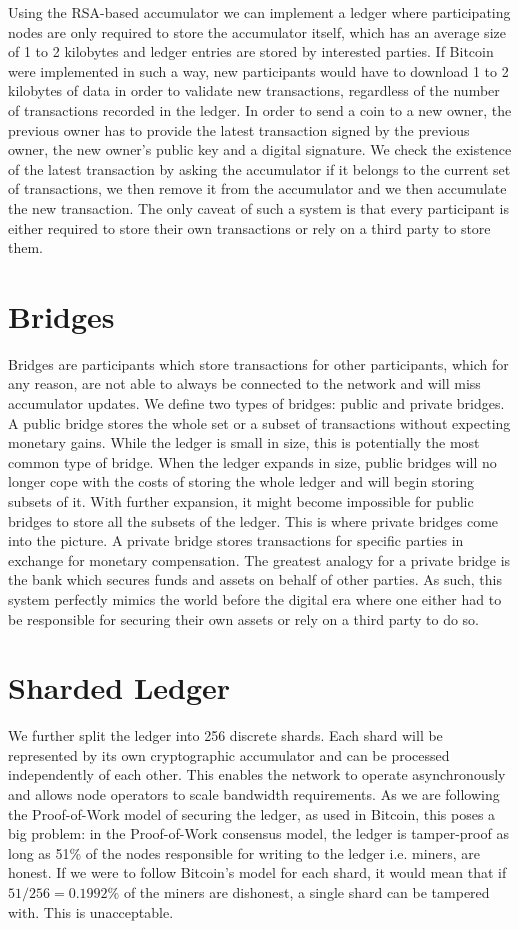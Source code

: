 \documentclass[notitlepage]{article}
\begin{document}
Using the RSA-based accumulator we can implement a ledger where participating nodes are only required to store the accumulator itself, which has an average size of 1 to 2 kilobytes and ledger entries are stored by interested parties. If Bitcoin were implemented in such a way, new participants would have to download 1 to 2 kilobytes of data in order to validate new transactions, regardless of the number of transactions recorded in the ledger. In order to send a coin to a new owner, the previous owner has to provide the latest transaction signed by the previous owner, the new owner's public key and a digital signature. We check the existence of the latest transaction by asking the accumulator if it belongs to the current set of transactions, we then remove it from the accumulator and we then accumulate the new transaction. The only caveat of such a system is that every participant is either required to store their own transactions or rely on a third party to store them.

\section{Bridges}
Bridges are participants which store transactions for other participants, which for any reason, are not able to always be connected to the network and will miss accumulator updates. We define two types of bridges: public and private bridges. A public bridge stores the whole set or a subset of transactions without expecting monetary gains. While the ledger is small in size, this is potentially the most common type of bridge. When the ledger expands in size, public bridges will no longer cope with the costs of storing the whole ledger and will begin storing subsets of it. With further expansion, it might become impossible for public bridges to store all the subsets of the ledger. This is where private bridges come into the picture. A private bridge stores transactions for specific parties in exchange for monetary compensation. The greatest analogy for a private bridge is the bank which secures funds and assets on behalf of other parties. As such, this system perfectly mimics the world before the digital era where one either had to be responsible for securing their own assets or rely on a third party to do so.

\section{Sharded Ledger}
We further split the ledger into 256 discrete shards. Each shard will be represented by its own cryptographic accumulator and can be processed independently of each other. This enables the network to operate asynchronously and allows node operators to scale bandwidth requirements. As we are following the Proof-of-Work model of securing the ledger, as used in Bitcoin, this poses a big problem: in the Proof-of-Work consensus model, the ledger is tamper-proof as long as 51\% of the nodes responsible for writing to the ledger i.e. miners, are honest. If we were to follow Bitcoin's model for each shard, it would mean that if $51/256 = 0.1992\%$ of the miners are dishonest, a single shard can be tampered with. This is unacceptable. 
\end{document}
